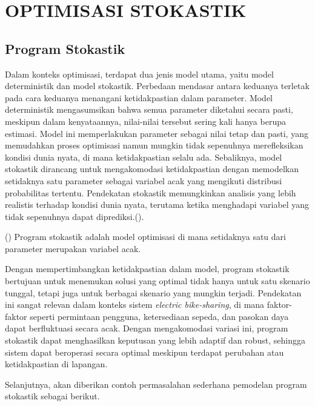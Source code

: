 \chapter{OPTIMISASI STOKASTIK}

\section{Program Stokastik}
Dalam konteks optimisasi, terdapat dua jenis model utama, yaitu model deterministik dan model stokastik. Perbedaan mendasar antara keduanya terletak pada cara keduanya menangani ketidakpastian dalam parameter. Model deterministik mengasumsikan bahwa semua parameter diketahui secara pasti, meskipun dalam kenyataannya, nilai-nilai tersebut sering kali hanya berupa estimasi. Model ini memperlakukan parameter sebagai nilai tetap dan pasti, yang memudahkan proses optimisasi namun mungkin tidak sepenuhnya merefleksikan kondisi dunia nyata, di mana ketidakpastian selalu ada. Sebaliknya, model stokastik dirancang untuk mengakomodasi ketidakpastian dengan memodelkan setidaknya satu parameter sebagai variabel acak yang mengikuti distribusi probabilitas tertentu. Pendekatan stokastik memungkinkan analisis yang lebih realistis terhadap kondisi dunia nyata, terutama ketika menghadapi variabel yang tidak sepenuhnya dapat diprediksi.().

\begin{definisi} ()
    Program stokastik adalah model optimisasi di mana setidaknya satu dari parameter merupakan variabel acak.
\end{definisi}

Dengan mempertimbangkan ketidakpastian dalam model, program stokastik bertujuan untuk menemukan solusi yang optimal tidak hanya untuk satu skenario tunggal, tetapi juga untuk berbagai skenario yang mungkin terjadi. Pendekatan ini sangat relevan dalam konteks sistem \textit{electric bike-sharing}, di mana faktor-faktor seperti permintaan pengguna, ketersediaan sepeda, dan pasokan daya dapat berfluktuasi secara acak. Dengan mengakomodasi variasi ini, program stokastik dapat menghasilkan keputusan yang lebih adaptif dan robust, sehingga sistem dapat beroperasi secara optimal meskipun terdapat perubahan atau ketidakpastian di lapangan.

Selanjutnya, akan diberikan contoh permasalahan sederhana pemodelan program stokastik sebagai berikut.

